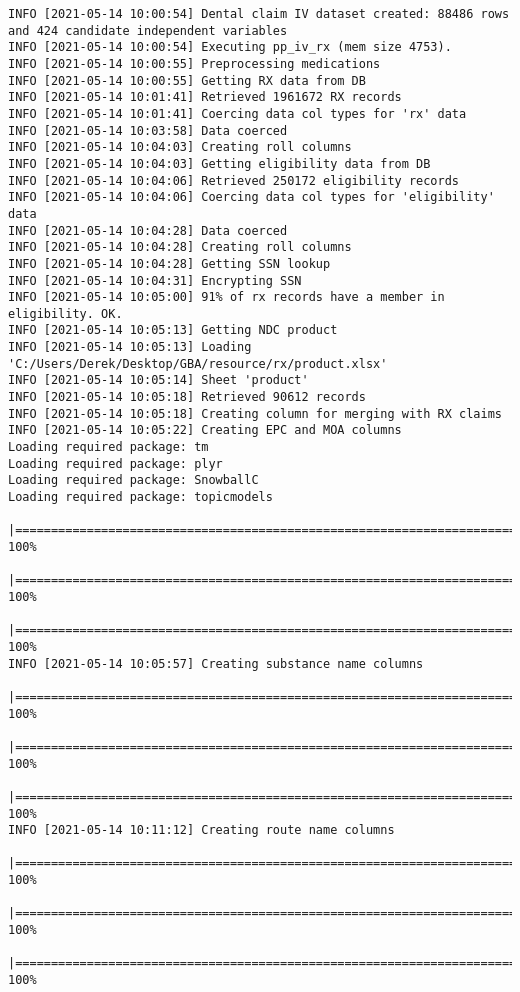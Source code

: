 \documentclass[
]{book}
\begin{document}
\begin{verbatim}
INFO [2021-05-14 10:00:54] Dental claim IV dataset created: 88486 rows and 424 candidate independent variables
INFO [2021-05-14 10:00:54] Executing pp_iv_rx (mem size 4753).
INFO [2021-05-14 10:00:55] Preprocessing medications
INFO [2021-05-14 10:00:55] Getting RX data from DB
INFO [2021-05-14 10:01:41] Retrieved 1961672 RX records
INFO [2021-05-14 10:01:41] Coercing data col types for 'rx' data
INFO [2021-05-14 10:03:58] Data coerced
INFO [2021-05-14 10:04:03] Creating roll columns
INFO [2021-05-14 10:04:03] Getting eligibility data from DB
INFO [2021-05-14 10:04:06] Retrieved 250172 eligibility records
INFO [2021-05-14 10:04:06] Coercing data col types for 'eligibility' data
INFO [2021-05-14 10:04:28] Data coerced
INFO [2021-05-14 10:04:28] Creating roll columns
INFO [2021-05-14 10:04:28] Getting SSN lookup
INFO [2021-05-14 10:04:31] Encrypting SSN
INFO [2021-05-14 10:05:00] 91% of rx records have a member in eligibility. OK.
INFO [2021-05-14 10:05:13] Getting NDC product
INFO [2021-05-14 10:05:13] Loading 'C:/Users/Derek/Desktop/GBA/resource/rx/product.xlsx'
INFO [2021-05-14 10:05:14] Sheet 'product'
INFO [2021-05-14 10:05:18] Retrieved 90612 records
INFO [2021-05-14 10:05:18] Creating column for merging with RX claims
INFO [2021-05-14 10:05:22] Creating EPC and MOA columns
Loading required package: tm
Loading required package: plyr
Loading required package: SnowballC
Loading required package: topicmodels
  |===============================================================================================================| 100%
  |===============================================================================================================| 100%
  |===============================================================================================================| 100%
INFO [2021-05-14 10:05:57] Creating substance name columns
  |===============================================================================================================| 100%
  |===============================================================================================================| 100%
  |===============================================================================================================| 100%
INFO [2021-05-14 10:11:12] Creating route name columns
  |===============================================================================================================| 100%
  |===============================================================================================================| 100%
  |===============================================================================================================| 100%

\end{verbatim}
\end{document}
